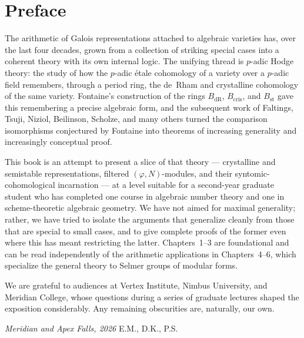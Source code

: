 \documentclass[10pt]{amsbook}
\theoremstyle{definition}
\theoremstyle{remark}
\begin{document}
\maketitle

\setcounter{tocdepth}{1}
\tableofcontents

\chapter*{Preface}

The arithmetic of Galois representations attached to algebraic varieties has, over the last
four decades, grown from a collection of striking special cases into a coherent theory with
its own internal logic. The unifying thread is $p$-adic Hodge theory: the study of how the
$p$-adic étale cohomology of a variety over a $p$-adic field remembers, through a period
ring, the de~Rham and crystalline cohomology of the same variety. Fontaine's construction of
the rings $B_{\mathrm{dR}}$, $B_{\mathrm{cris}}$, and $B_{\mathrm{st}}$ gave this remembering a
precise algebraic form, and the subsequent work of Faltings, Tsuji, Niziol, Beilinson, Scholze,
and many others turned the comparison isomorphisms conjectured by Fontaine into theorems of
increasing generality and increasingly conceptual proof.

This book is an attempt to present a slice of that theory — crystalline and semistable
representations, filtered $(\varphi,N)$-modules, and their syntomic-cohomological incarnation
— at a level suitable for a second-year graduate student who has completed one course in
algebraic number theory and one in scheme-theoretic algebraic geometry. We have not aimed for
maximal generality; rather, we have tried to isolate the arguments that generalize cleanly
from those that are special to small cases, and to give complete proofs of the former even
where this has meant restricting the latter. Chapters~1--3 are foundational and can be read
independently of the arithmetic applications in Chapters~4--6, which specialize the general
theory to Selmer groups of modular forms.

We are grateful to audiences at Vertex Institute, Nimbus University, and Meridian College, whose
questions during a series of graduate lectures shaped the exposition considerably. Any
remaining obscurities are, naturally, our own.

\bigskip
\noindent \textit{Meridian and Apex Falls, 2026} \hfill E.M., D.K., P.S.
\end{document}
